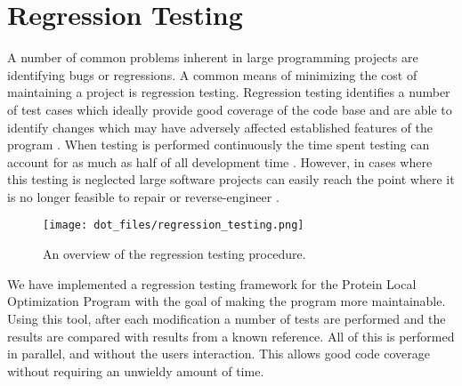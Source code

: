 \section{Regression Testing}
\label{section:unsorted/regression_testing}
A number of common problems inherent in large programming projects are identifying bugs or regressions. 
A common means of minimizing the cost of maintaining a project is regression testing.
Regression testing identifies a number of test cases which ideally provide good coverage of the code base and are able to identify changes which may have adversely affected established features of the program \cite{wong1997study}.
When testing is performed continuously the time spent testing can account for as much as half of all development time \cite{leung1989insights}.
However, in cases where this testing is neglected large software projects can easily reach the point where it is no longer feasible to repair or reverse-engineer \cite{weide1995reverse}.

\begin{figure}[h]
\centering
\texttt{[image: dot\_files/regression\_testing.png]}
\caption{An overview of the regression testing procedure.}
\label{figure:regression_testing_flowchart}
\end{figure}

We have implemented a regression testing framework for the Protein Local Optimization Program with the goal of making the program more maintainable.
Using this tool, after each modification a number of tests are performed and the results are compared with results from a known reference.
All of this is performed in parallel, and without the users interaction.
This allows good code coverage without requiring an unwieldy amount of time.

